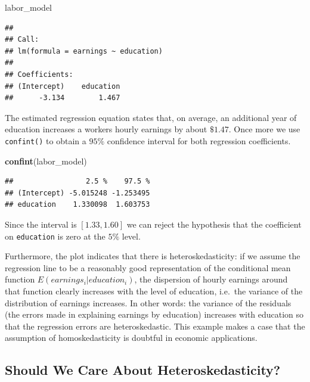 \documentclass[]{book}
\newenvironment{Shaded}{\begin{snugshade}}{\end{snugshade}}
\newcommand{\KeywordTok}[1]{\textcolor[rgb]{0.13,0.29,0.53}{\textbf{#1}}}
\newcommand{\NormalTok}[1]{#1}
\theoremstyle{definition}
\theoremstyle{definition}
\theoremstyle{definition}
\theoremstyle{remark}
\begin{document}
\begin{Shaded}
\begin{Highlighting}[]
\NormalTok{labor_model}
\end{Highlighting}
\end{Shaded}

\begin{verbatim}
## 
## Call:
## lm(formula = earnings ~ education)
## 
## Coefficients:
## (Intercept)    education  
##      -3.134        1.467
\end{verbatim}

The estimated regression equation states that, on average, an additional
year of education increases a workers hourly earnings by about
\(\$ 1.47\). Once more we use \texttt{confint()} to obtain a \(95\%\)
confidence interval for both regression coefficients.

\begin{Shaded}
\begin{Highlighting}[]
\KeywordTok{confint}\NormalTok{(labor_model)}
\end{Highlighting}
\end{Shaded}

\begin{verbatim}
##                 2.5 %    97.5 %
## (Intercept) -5.015248 -1.253495
## education    1.330098  1.603753
\end{verbatim}

Since the interval is \([1.33, 1.60]\) we can reject the hypothesis that
the coefficient on \texttt{education} is zero at the \(5\%\) level.

Furthermore, the plot indicates that there is heteroskedasticity: if we
assume the regression line to be a reasonably good representation of the
conditional mean function \(E(earnings_i\vert education_i)\), the
dispersion of hourly earnings around that function clearly increases
with the level of education, i.e.~the variance of the distribution of
earnings increases. In other words: the variance of the residuals (the
errors made in explaining earnings by education) increases with
education so that the regression errors are heteroskedastic. This
example makes a case that the assumption of homoskedasticity is doubtful
in economic applications.

\subsection*{Should We Care About
Heteroskedasticity?}\label{should-we-care-about-heteroskedasticity}
\end{document}
